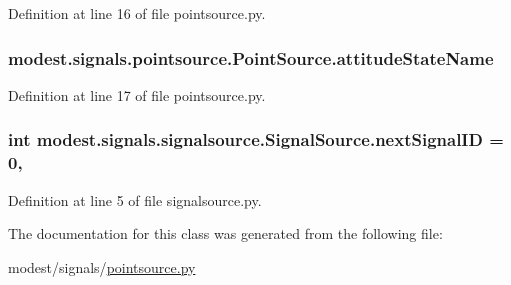 Definition at line 16 of file pointsource.\+py.

\subsubsection[{\texorpdfstring{attitude\+State\+Name}{attitudeStateName}}]{\setlength{\rightskip}{0pt plus 5cm}modest.\+signals.\+pointsource.\+Point\+Source.\+attitude\+State\+Name}\hypertarget{classmodest_1_1signals_1_1pointsource_1_1PointSource_a0924a2233bb4fd23e50d024e4f1b048e}{}\label{classmodest_1_1signals_1_1pointsource_1_1PointSource_a0924a2233bb4fd23e50d024e4f1b048e}


Definition at line 17 of file pointsource.\+py.

\subsubsection[{\texorpdfstring{next\+Signal\+ID}{nextSignalID}}]{\setlength{\rightskip}{0pt plus 5cm}int modest.\+signals.\+signalsource.\+Signal\+Source.\+next\+Signal\+ID = 0\hspace{0.3cm}{\ttfamily [static]}, {\ttfamily [inherited]}}\hypertarget{classmodest_1_1signals_1_1signalsource_1_1SignalSource_a453eafb550b551adbec0903deb63dfce}{}\label{classmodest_1_1signals_1_1signalsource_1_1SignalSource_a453eafb550b551adbec0903deb63dfce}


Definition at line 5 of file signalsource.\+py.



The documentation for this class was generated from the following file\+:\begin{DoxyCompactItemize}
\item 
modest/signals/\hyperlink{pointsource_8py}{pointsource.\+py}\end{DoxyCompactItemize}
